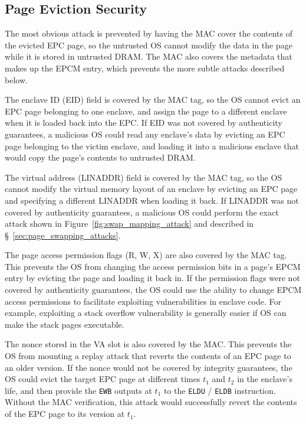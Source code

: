 \subsection {Page Eviction Security}

The most obvious attack is prevented by having the MAC cover the contents of
the evicted EPC page, so the untrusted OS cannot modify the data in the page
while it is stored in untrusted DRAM. The MAC also covers the metadata that
makes up the EPCM entry, which prevents the more subtle attacks described
below.

The enclave ID (EID) field is covered by the MAC tag, so the OS cannot evict an
EPC page belonging to one enclave, and assign the page to a different enclave
when it is loaded back into the EPC. If EID was not covered by authenticity
guarantees, a malicious OS could read any enclave's data by evicting an EPC
page belonging to the victim enclave, and loading it into a malicious enclave
that would copy the page's contents to untrusted DRAM.

The virtual address (LINADDR) field is covered by the MAC tag, so the OS cannot
modify the virtual memory layout of an enclave by evicting an EPC page and
specifying a different LINADDR when loading it back. If LINADDR was not covered
by authenticity guarantees, a malicious OS could perform the exact attack shown
in Figure~\ref{fig:swap_mapping_attack} and described in
\S~\ref{sec:page_swapping_attacks}.

The page access permission flags (R, W, X) are also covered by the MAC tag.
This prevents the OS from changing the access permission bits in a page's EPCM
entry by evicting the page and loading it back in. If the permission flags were
not covered by authenticity guarantees, the OS could use the ability to change
EPCM access permissions to facilitate exploiting vulnerabilities in enclave
code. For example, exploiting a stack overflow vulnerability is generally
easier if OS can make the stack pages executable.

The nonce stored in the VA slot is also covered by the MAC. This prevents the
OS from mounting a replay attack that reverts the contents of an EPC page to an
older version. If the nonce would not be covered by integrity guarantees, the
OS could evict the target EPC page at different times $t_1$ and $t_2$ in the
enclave's life, and then provide the \texttt{EWB} outputs at $t_1$ to the
\texttt{ELDU} / \texttt{ELDB} instruction. Without the MAC verification, this
attack would successfully revert the contents of the EPC page to its version
at $t_1$.


